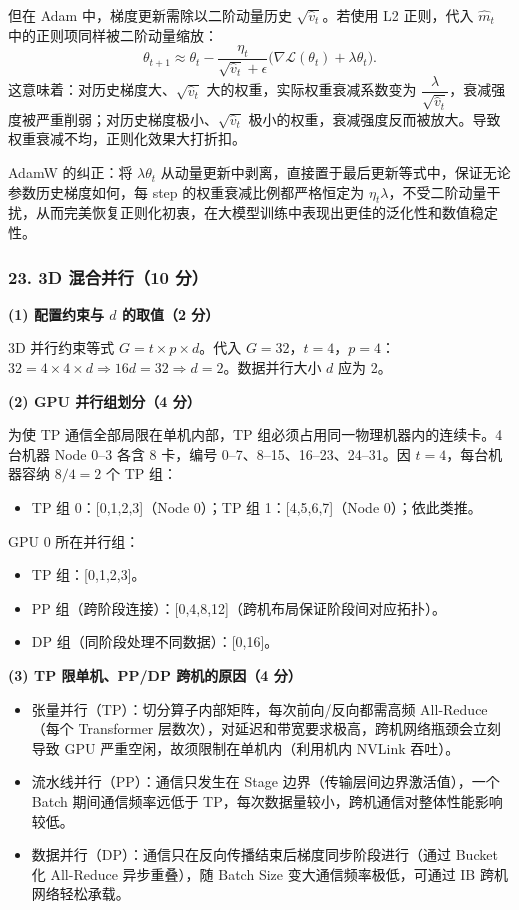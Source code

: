 \documentclass[11pt,a4paper]{article}
\begin{document}
但在 Adam 中，梯度更新需除以二阶动量历史 $\sqrt{\hat{v}_t}$。若使用 L2 正则，代入 $\hat{m}_t$ 中的正则项同样被二阶动量缩放：
\[
\theta_{t+1}\approx\theta_t-\frac{\eta_t}{\sqrt{\hat{v}_t}+\epsilon}\big(\nabla\mathcal{L}(\theta_t)+\lambda\theta_t\big).
\]
这意味着：对历史梯度大、$\sqrt{\hat{v}_t}$ 大的权重，实际权重衰减系数变为 $\dfrac{\lambda}{\sqrt{\hat{v}_t}}$，衰减强度被严重削弱；对历史梯度极小、$\sqrt{\hat{v}_t}$ 极小的权重，衰减强度反而被放大。导致权重衰减不均，正则化效果大打折扣。

AdamW 的纠正：将 $\lambda\theta_t$ 从动量更新中剥离，直接置于最后更新等式中，保证无论参数历史梯度如何，每 step 的权重衰减比例都严格恒定为 $\eta_t\lambda$，不受二阶动量干扰，从而完美恢复正则化初衷，在大模型训练中表现出更佳的泛化性和数值稳定性。

\subsubsection*{23. 3D 混合并行（10 分）}

\noindent\textbf{(1) 配置约束与 $d$ 的取值（2 分）}

3D 并行约束等式 $G=t\times p\times d$。代入 $G=32$，$t=4$，$p=4$：$32=4\times4\times d\Rightarrow 16d=32\Rightarrow d=2$。数据并行大小 $d$ 应为 2。

\noindent\textbf{(2) GPU 并行组划分（4 分）}

为使 TP 通信全部局限在单机内部，TP 组必须占用同一物理机器内的连续卡。4 台机器 Node 0--3 各含 8 卡，编号 0--7、8--15、16--23、24--31。因 $t=4$，每台机器容纳 $8/4=2$ 个 TP 组：
\begin{itemize}[leftmargin=2em,itemsep=0pt,parsep=0pt,topsep=0pt]
  \item TP 组 0：[0,1,2,3]（Node 0）；TP 组 1：[4,5,6,7]（Node 0）；依此类推。
\end{itemize}
GPU 0 所在并行组：
\begin{itemize}[leftmargin=2em,itemsep=0pt,parsep=0pt,topsep=0pt]
  \item TP 组：[0,1,2,3]。
  \item PP 组（跨阶段连接）：[0,4,8,12]（跨机布局保证阶段间对应拓扑）。
  \item DP 组（同阶段处理不同数据）：[0,16]。
\end{itemize}

\noindent\textbf{(3) TP 限单机、PP/DP 跨机的原因（4 分）}

\begin{itemize}[leftmargin=2em,itemsep=0pt,parsep=0pt,topsep=0pt]
  \item 张量并行（TP）：切分算子内部矩阵，每次前向/反向都需高频 All-Reduce（每个 Transformer 层数次），对延迟和带宽要求极高，跨机网络瓶颈会立刻导致 GPU 严重空闲，故须限制在单机内（利用机内 NVLink 吞吐）。
  \item 流水线并行（PP）：通信只发生在 Stage 边界（传输层间边界激活值），一个 Batch 期间通信频率远低于 TP，每次数据量较小，跨机通信对整体性能影响较低。
  \item 数据并行（DP）：通信只在反向传播结束后梯度同步阶段进行（通过 Bucket 化 All-Reduce 异步重叠），随 Batch Size 变大通信频率极低，可通过 IB 跨机网络轻松承载。
\end{itemize}
\end{document}
